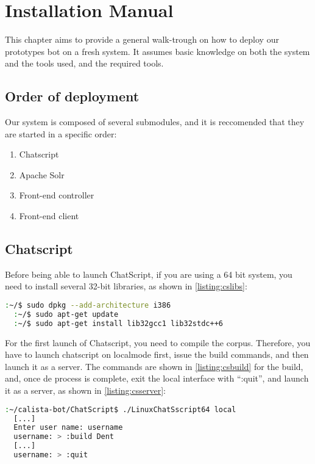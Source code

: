 \chapter{Installation Manual}

This chapter aims to provide a general walk-trough on how to deploy our prototypes bot on a fresh system. It assumes basic knowledge on both the system and the tools used, and the required tools.

\section{Order of deployment}

Our system is composed of several submodules, and it is reccomended that they are started in a specific order:
\begin{enumerate}
 \item Chatscript
 \item Apache Solr
 \item Front-end controller
 \item Front-end client
\end{enumerate}

\section{Chatscript}

Before being able to launch ChatScript, if you are using a 64 bit system, you need to install several 32-bit libraries, as shown in \ref{listing:cslibs}:

\begin{center} 
  \begin{lstlisting}[language=bash, captionpos=b, caption=Libraries for ChatScript, label=listing:cslibs]
  :~/$ sudo dpkg --add-architecture i386
  :~/$ sudo apt-get update
  :~/$ sudo apt-get install lib32gcc1 lib32stdc++6
  \end{lstlisting}
\end{center}


For the first launch of Chatscript, you need to compile the corpus. Therefore, you have to launch chatscript on localmode first, issue the build commands, and then launch it as a server. The commands are shown in \ref{listing:csbuild} for the build, and, once de process is complete, exit the local interface with ``:quit'', and launch it as a server, as shown in \ref{listing:csserver}:

\begin{center} 
  \begin{lstlisting}[language=bash, captionpos=b, caption=ChatScript build command, label=listing:csbuild]
  :~/calista-bot/ChatScript$ ./LinuxChatSscript64 local
  [...]
  Enter user name: username
  username: > :build Dent
  [...]
  username: > :quit
  \end{lstlisting}
\end{center}

